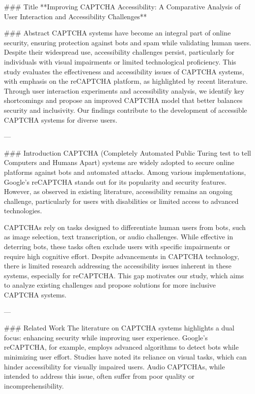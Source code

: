 ### Title  
**Improving CAPTCHA Accessibility: A Comparative Analysis of User Interaction and Accessibility Challenges**

### Abstract  
CAPTCHA systems have become an integral part of online security, ensuring protection against bots and spam while validating human users. Despite their widespread use, accessibility challenges persist, particularly for individuals with visual impairments or limited technological proficiency. This study evaluates the effectiveness and accessibility issues of CAPTCHA systems, with emphasis on the reCAPTCHA platform, as highlighted by recent literature. Through user interaction experiments and accessibility analysis, we identify key shortcomings and propose an improved CAPTCHA model that better balances security and inclusivity. Our findings contribute to the development of accessible CAPTCHA systems for diverse users.

---

### Introduction  
CAPTCHA (Completely Automated Public Turing test to tell Computers and Humans Apart) systems are widely adopted to secure online platforms against bots and automated attacks. Among various implementations, Google's reCAPTCHA stands out for its popularity and security features. However, as observed in existing literature, accessibility remains an ongoing challenge, particularly for users with disabilities or limited access to advanced technologies.

CAPTCHAs rely on tasks designed to differentiate human users from bots, such as image selection, text transcription, or audio challenges. While effective in deterring bots, these tasks often exclude users with specific impairments or require high cognitive effort. Despite advancements in CAPTCHA technology, there is limited research addressing the accessibility issues inherent in these systems, especially for reCAPTCHA. This gap motivates our study, which aims to analyze existing challenges and propose solutions for more inclusive CAPTCHA systems.

---

### Related Work  
The literature on CAPTCHA systems highlights a dual focus: enhancing security while improving user experience. Google's reCAPTCHA, for example, employs advanced algorithms to detect bots while minimizing user effort. Studies have noted its reliance on visual tasks, which can hinder accessibility for visually impaired users. Audio CAPTCHAs, while intended to address this issue, often suffer from poor quality or incomprehensibility.

